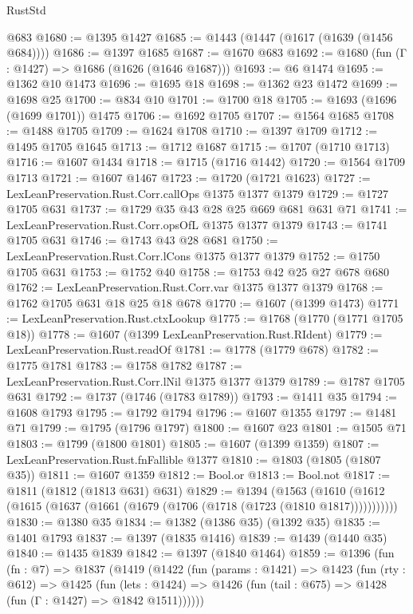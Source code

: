 \begin{lexlean}{RustStd}
\begin{coremodule}
    @683
@1680 := @1395 @1427
@1685 := @1443 (@1447 (@1617 (@1639 (@1456 @684))))
@1686 := @1397 @1685
@1687 := @1670 @683
@1692 := @1680 (fun (Γ : @1427) => @1686 (@1626 (@1646 @1687)))
@1693 := @6 @1474
@1695 := @1362 @10 @1473
@1696 := @1695 @18
@1698 := @1362 @23 @1472
@1699 := @1698 @25
@1700 := @834 @10
@1701 := @1700 @18
@1705 := @1693 (@1696 (@1699 @1701)) @1475
@1706 := @1692 @1705
@1707 := @1564 @1685
@1708 := @1488 @1705
@1709 := @1624 @1708
@1710 := @1397 @1709
@1712 := @1495 @1705 @1645
@1713 := @1712 @1687
@1715 := @1707 (@1710 @1713)
@1716 := @1607 @1434
@1718 := @1715 (@1716 @1442)
@1720 := @1564 @1709 @1713
@1721 := @1607 @1467
@1723 := @1720 (@1721 @1623)
@1727 := LexLeanPreservation.Rust.Corr.callOps @1375 @1377 @1379
@1729 := @1727 @1705 @631
@1737 := @1729 @35 @43 @28 @25 @669 @681 @631 @71
@1741 := LexLeanPreservation.Rust.Corr.opsOfL @1375 @1377 @1379
@1743 := @1741 @1705 @631
@1746 := @1743 @43 @28 @681
@1750 := LexLeanPreservation.Rust.Corr.lCons @1375 @1377 @1379
@1752 := @1750 @1705 @631
@1753 := @1752 @40
@1758 := @1753 @42 @25 @27 @678 @680
@1762 := LexLeanPreservation.Rust.Corr.var @1375 @1377 @1379
@1768 := @1762 @1705 @631 @18 @25 @18 @678
@1770 := @1607 (@1399 @1473)
@1771 := LexLeanPreservation.Rust.ctxLookup
@1775 := @1768 (@1770 (@1771 @1705 @18))
@1778 := @1607 (@1399 LexLeanPreservation.Rust.RIdent)
@1779 := LexLeanPreservation.Rust.readOf
@1781 := @1778 (@1779 @678)
@1782 := @1775 @1781
@1783 := @1758 @1782
@1787 := LexLeanPreservation.Rust.Corr.lNil @1375 @1377 @1379
@1789 := @1787 @1705 @631
@1792 := @1737 (@1746 (@1783 @1789))
@1793 := @1411 @35
@1794 := @1608 @1793
@1795 := @1792 @1794
@1796 := @1607 @1355
@1797 := @1481 @71
@1799 := @1795 (@1796 @1797)
@1800 := @1607 @23
@1801 := @1505 @71
@1803 := @1799 (@1800 @1801)
@1805 := @1607 (@1399 @1359)
@1807 := LexLeanPreservation.Rust.fnFallible @1377
@1810 := @1803 (@1805 (@1807 @35))
@1811 := @1607 @1359
@1812 := Bool.or
@1813 := Bool.not
@1817 := @1811 (@1812 (@1813 @631) @631)
@1829 := @1394
    (@1563 (@1610 (@1612 (@1615 (@1637 (@1661 (@1679 (@1706 (@1718 (@1723 (@1810 @1817)))))))))))
@1830 := @1380 @35
@1834 := @1382 (@1386 @35) (@1392 @35)
@1835 := @1401 @1793
@1837 := @1397 (@1835 @1416)
@1839 := @1439 (@1440 @35)
@1840 := @1435 @1839
@1842 := @1397 (@1840 @1464)
@1859 := @1396
    (fun (fn : @7) =>
    @1837
      (@1419
        (@1422
          (fun (params : @1421) =>
          @1423
            (fun (rty : @612) =>
            @1425
              (fun (lets : @1424) =>
              @1426 (fun (tail : @675) => @1428 (fun (Γ : @1427) => @1842 @1511))))))

\end{coremodule}
\end{lexlean}
